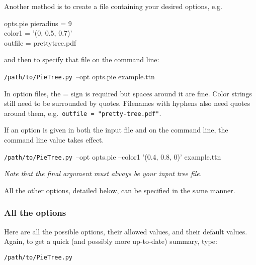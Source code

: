 \documentclass[10pt]{article}
\newcommand{\PTpath}{\texttt{/path/to/PieTree.py}\xspace}
\begin{document}
Another method is to create a file containing your desired options, e.g.\
\begin{filesays}{opts.pie}
	pieradius = 9				\\
	color1 = '(0, 0.5, 0.7)'		\\
	outfile = prettytree.pdf
\end{filesays}
and then to specify that file on the command line:
\begin{commandis}
	\PTpath \ --opt opts.pie example.ttn
\end{commandis}
In option files, the = sign is required but spaces around it are fine.
Color strings still need to be surrounded by quotes.
Filenames with hyphens also need quotes around them, e.g.\ \texttt{outfile = "pretty-tree.pdf"}.

If an option is given in both the input file and on the command line, the command line value takes effect.
\begin{commandis}
	\PTpath \ --opt opts.pie --color1 '(0.4, 0.8, 0)' example.ttn
\end{commandis}

{\em Note that the final argument must always be your input tree file.}

All the other options, detailed below, can be specified in the same manner.


\subsubsection*{All the options}

Here are all the possible options, their allowed values, and their default values.
Again, to get a quick (and possibly more up-to-date) summary, type:
\begin{commandis}
	\PTpath
\end{commandis}
\end{document}
